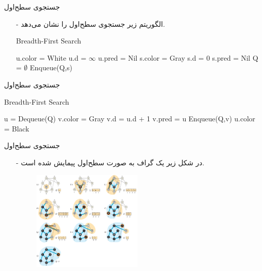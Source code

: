 \begin{frame}{‌جستجوی سطح‌اول}
\begin{itemize}\itemr
\item[-]
الگوریتم زیر جستجوی سطح‌اول را نشان می‌دهد.
\begin{algorithm}[H]\alglr
  \caption{Breadth-First Search} 
  \begin{algorithmic}[1]
   			\State u.color = White
   			\State u.d = $\infty$
   			\State u.pred = Nil
   	\EndFor
   	\State s.color = Gray
   	\State s.d = 0
   	\State s.pred = Nil
   	\State Q = $\emptyset$
   	\State Enqueue(Q,s)         
  \end{algorithmic}
  \label{alg:merge}
\end{algorithm}
\end{itemize}
\end{frame}


\begin{frame}{‌جستجوی سطح‌اول}
\begin{algorithm}[H]\alglr
  \caption{Breadth-First Search} 
  \begin{algorithmic}[1]
  \setcounter{ALG@line}{9}
        		\State u = Dequeue(Q)
        				
        					
        				\State v.color = Gray
        				\State v.d = u.d + 1
        				\State v.pred = u
        				\State Enqueue(Q,v)		
        			\EndIf
        		\EndFor
        		\State u.color = Black		
        \EndWhile		                   
  \end{algorithmic}
  \label{alg:merge}
\end{algorithm}
\end{frame}


\begin{frame}{‌جستجوی سطح‌اول}
\begin{itemize}\itemr
\item[-]
در شکل زیر یک گراف به صورت سطح‌اول پیمایش شده است.
\begin{figure}
\includegraphics[width=0.5\textwidth]{figs/chap07/557-bfs}
\end{figure}
\end{itemize}
\end{frame}


